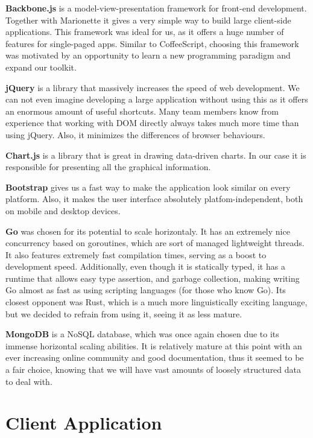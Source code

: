 \documentclass{l3proj}
\begin{document}
\textbf{Backbone.js} is a model-view-presentation framework for front-end development. Together with Marionette it gives a very simple way to build large client-side applications. This framework was ideal for us, as it offers a huge number of features for single-paged apps. Similar to CoffeeScript, choosing this framework was motivated by an opportunity to learn a new programming paradigm and expand our toolkit.

\textbf{jQuery} is a library that massively increases the speed of web development. We can not even imagine developing a large application without using this as it offers an enormous amount of useful shortcuts. Many team members know from experience that working with DOM directly always takes much more time than using jQuery. Also, it minimizes the differences of browser behaviours.

\textbf{Chart.js} is a library that is great in drawing data-driven charts. In our case it is responsible for presenting all the graphical information.

\textbf{Bootstrap} gives us a fast way to make the application look similar on every platform. Also, it makes the user interface absolutely platfom-independent, both on mobile and desktop devices.

\textbf{Go} was chosen for its potential to scale horizontaly. It has an extremely nice concurrency based on goroutines, which are sort of managed lightweight threads. It also features extremely fast compilation times, serving as a boost to development speed. Additionally, even though it is statically typed, it has a runtime that allows easy type assertion, and garbage collection, making writing Go almost as fast as using scripting languages (for those who know Go). Its closest opponent was Rust, which is a much more linguistically exciting language, but we decided to refrain from using it, seeing it as less mature.

\textbf{MongoDB} is a NoSQL database, which was once again chosen due to its immense horizontal scaling abilities. It is relatively mature at this point with an ever increasing online community and good documentation, thus it seemed to be a fair choice, knowing that we will have vast amounts of loosely structured data to deal with.


\section{Client Application}
\end{document}
